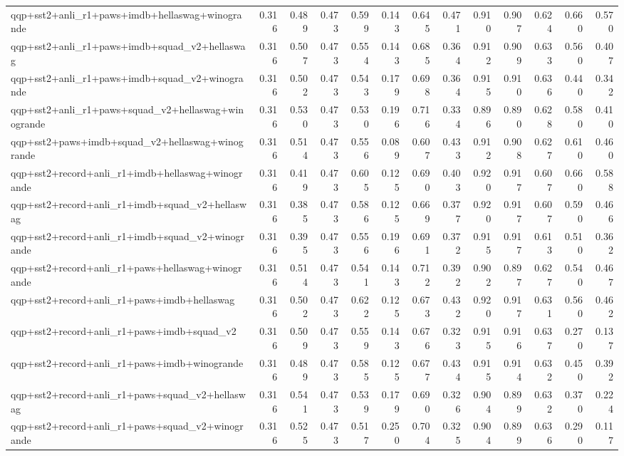 \begin{table}[t]
\begin{tabular}{lrrrrrrrrrrrr}
    qqp+sst2+anli\_r1+paws+imdb+hellaswag+winogrande & 0.316 & 0.489 & 0.473 & 0.599 & 0.143 & 0.645 & 0.471 & 0.910 & 0.907 & 0.624 & 0.660 & 0.570 \\
    qqp+sst2+anli\_r1+paws+imdb+squad\_v2+hellaswag & 0.316 & 0.507 & 0.473 & 0.554 & 0.143 & 0.685 & 0.364 & 0.912 & 0.909 & 0.633 & 0.560 & 0.407 \\
    qqp+sst2+anli\_r1+paws+imdb+squad\_v2+winogrande & 0.316 & 0.502 & 0.473 & 0.543 & 0.179 & 0.698 & 0.364 & 0.915 & 0.910 & 0.636 & 0.440 & 0.342 \\
    qqp+sst2+anli\_r1+paws+squad\_v2+hellaswag+winogrande & 0.316 & 0.530 & 0.473 & 0.530 & 0.196 & 0.716 & 0.334 & 0.896 & 0.890 & 0.628 & 0.580 & 0.410 \\
    qqp+sst2+paws+imdb+squad\_v2+hellaswag+winogrande & 0.316 & 0.514 & 0.473 & 0.556 & 0.089 & 0.607 & 0.433 & 0.912 & 0.908 & 0.627 & 0.610 & 0.460 \\
    qqp+sst2+record+anli\_r1+imdb+hellaswag+winogrande & 0.316 & 0.419 & 0.473 & 0.605 & 0.125 & 0.690 & 0.403 & 0.920 & 0.917 & 0.607 & 0.660 & 0.588 \\
    qqp+sst2+record+anli\_r1+imdb+squad\_v2+hellaswag & 0.316 & 0.385 & 0.473 & 0.586 & 0.125 & 0.669 & 0.377 & 0.920 & 0.917 & 0.607 & 0.590 & 0.466 \\
    qqp+sst2+record+anli\_r1+imdb+squad\_v2+winogrande & 0.316 & 0.395 & 0.473 & 0.556 & 0.196 & 0.691 & 0.372 & 0.915 & 0.917 & 0.613 & 0.510 & 0.362 \\
    qqp+sst2+record+anli\_r1+paws+hellaswag+winogrande & 0.316 & 0.514 & 0.473 & 0.541 & 0.143 & 0.712 & 0.392 & 0.902 & 0.897 & 0.627 & 0.540 & 0.467 \\
    qqp+sst2+record+anli\_r1+paws+imdb+hellaswag & 0.316 & 0.502 & 0.473 & 0.622 & 0.125 & 0.673 & 0.432 & 0.920 & 0.917 & 0.631 & 0.560 & 0.462 \\
    qqp+sst2+record+anli\_r1+paws+imdb+squad\_v2 & 0.316 & 0.509 & 0.473 & 0.559 & 0.143 & 0.676 & 0.323 & 0.915 & 0.916 & 0.637 & 0.270 & 0.137 \\
    qqp+sst2+record+anli\_r1+paws+imdb+winogrande & 0.316 & 0.489 & 0.473 & 0.585 & 0.125 & 0.677 & 0.434 & 0.915 & 0.914 & 0.632 & 0.450 & 0.392 \\
    qqp+sst2+record+anli\_r1+paws+squad\_v2+hellaswag & 0.316 & 0.541 & 0.473 & 0.539 & 0.179 & 0.690 & 0.326 & 0.904 & 0.899 & 0.632 & 0.370 & 0.224 \\
    qqp+sst2+record+anli\_r1+paws+squad\_v2+winogrande & 0.316 & 0.525 & 0.473 & 0.517 & 0.250 & 0.704 & 0.325 & 0.904 & 0.899 & 0.636 & 0.290 & 0.117 \\

\end{tabular}
\end{table}
